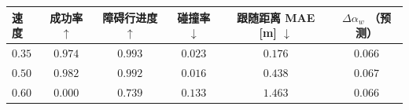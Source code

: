 \begin{tabular}{lccccc}
\toprule
速度 & 成功率 $\uparrow$ & 障碍行进度 $\uparrow$ & 碰撞率 $\downarrow$ & 跟随距离 MAE [m] $\downarrow$ &
$\Delta\alpha_w$ （预测） \\
\midrule
$0.35$ & $0.974$ & $0.993$ & $0.023$ & $0.176$ & $0.066$ \\
$0.50$ & $0.982$ & $0.992$ & $0.016$ & $0.438$ & $0.067$ \\
$0.60$ & $0.000$ & $0.739$ & $0.133$ & $1.463$ & $0.066$ \\
\bottomrule
\end{tabular}

